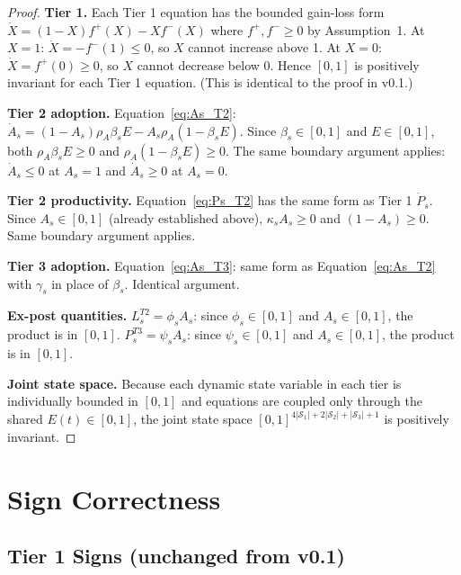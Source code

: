 \documentclass[11pt,a4paper]{article}
\begin{document}
\begin{proof}
\textbf{Tier 1.} Each Tier 1 equation has the bounded gain-loss form $\dot{X} = (1-X) f^+(X) - X f^-(X)$ where $f^+, f^- \geq 0$ by Assumption~1. At $X = 1$: $\dot{X} = -f^-(1) \leq 0$, so $X$ cannot increase above 1. At $X = 0$: $\dot{X} = f^+(0) \geq 0$, so $X$ cannot decrease below 0. Hence $[0,1]$ is positively invariant for each Tier 1 equation. (This is identical to the proof in v0.1.)

\textbf{Tier 2 adoption.} Equation~\eqref{eq:As_T2}: $\dot{A}_s = (1 - A_s)\rho_A \beta_s E - A_s \rho_A (1 - \beta_s E)$. Since $\beta_s \in [0,1]$ and $E \in [0,1]$, both $\rho_A \beta_s E \geq 0$ and $\rho_A(1 - \beta_s E) \geq 0$. The same boundary argument applies: $\dot{A}_s \leq 0$ at $A_s = 1$ and $\dot{A}_s \geq 0$ at $A_s = 0$.

\textbf{Tier 2 productivity.} Equation~\eqref{eq:Ps_T2} has the same form as Tier 1 $\dot{P}_s$. Since $A_s \in [0,1]$ (already established above), $\kappa_s A_s \geq 0$ and $(1 - A_s) \geq 0$. Same boundary argument applies.

\textbf{Tier 3 adoption.} Equation~\eqref{eq:As_T3}: same form as Equation~\eqref{eq:As_T2} with $\gamma_s$ in place of $\beta_s$. Identical argument.

\textbf{Ex-post quantities.} $L_s^{T2} = \phi_s A_s$: since $\phi_s \in [0,1]$ and $A_s \in [0,1]$, the product is in $[0,1]$. $P_s^{T3} = \psi_s A_s$: since $\psi_s \in [0,1]$ and $A_s \in [0,1]$, the product is in $[0,1]$.

\textbf{Joint state space.} Because each dynamic state variable in each tier is individually bounded in $[0,1]$ and equations are coupled only through the shared $E(t) \in [0,1]$, the joint state space $[0,1]^{4 |\mathcal{S}_1| + 2|\mathcal{S}_2| + |\mathcal{S}_3| + 1}$ is positively invariant.
\end{proof}

\section{Sign Correctness}

\subsection{Tier 1 Signs (unchanged from v0.1)}
\end{document}
